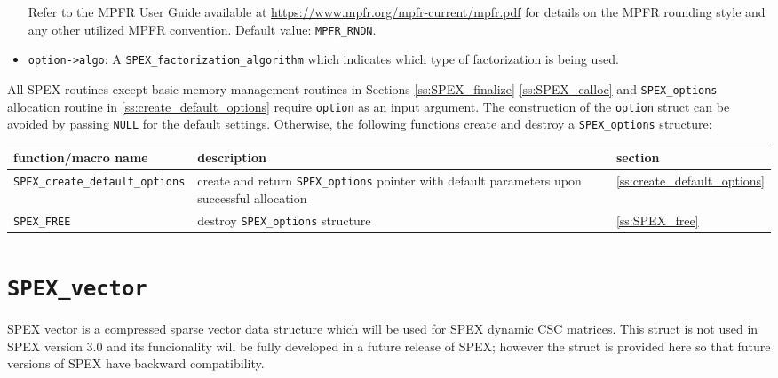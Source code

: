 \documentclass[12pt]{report}
\theoremstyle{definition}
\begin{document}
\begin{itemize}
\noindent Refer to the MPFR User Guide available at
\url{https://www.mpfr.org/mpfr-current/mpfr.pdf} for details on the MPFR
rounding style and any other utilized MPFR convention. Default value:
\verb|MPFR_RNDN|.

\item
\verb|option->algo|: A \verb|SPEX_factorization_algorithm| which indicates which type of factorization is being used.

\end{itemize}

All SPEX routines except basic memory management routines in Sections
\ref{ss:SPEX_finalize}-\ref{ss:SPEX_calloc} and \verb|SPEX_options| allocation
routine in \ref{ss:create_default_options} require \verb|option| as an input
argument.  The construction of the \verb|option| struct can be avoided by
passing \verb|NULL| for the default settings.  Otherwise, the following
functions create and destroy a \verb|SPEX_options| structure:

\begin{center}
\begin{tabular}{lp{2.5in}l}
\hline
function/macro name & description & section \\
\hline
\verb|SPEX_create_default_options|
    & create and return \verb|SPEX_options| pointer
      with default parameters upon successful allocation
    & \ref{ss:create_default_options} \\
\hline
\verb|SPEX_FREE|
    & destroy \verb|SPEX_options| structure
    & \ref{ss:SPEX_free} \\
\hline
\end{tabular}
\end{center}

\section{\texttt{SPEX\_vector}} \label{ss:SPEX_vector}

SPEX vector is a compressed sparse vector data structure which will be used for SPEX dynamic CSC matrices. This struct is not used in SPEX version 3.0 and its funcionality will be fully developed in a future release of SPEX; however the struct is provided here so that future versions of SPEX have backward compatibility. 
\end{document}
